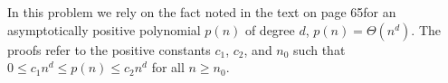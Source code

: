 In this problem we rely on the fact noted in the text on page 65\dash for an asymptotically positive polynomial $p(n)$ of degree $d$, $p(n)=\Theta(n^d)$.
The proofs refer to the positive constants $c_1$, $c_2$, and $n_0$ such that $0\le c_1n^d\le p(n)\le c_2n^d$ for all $n\ge n_0$.
